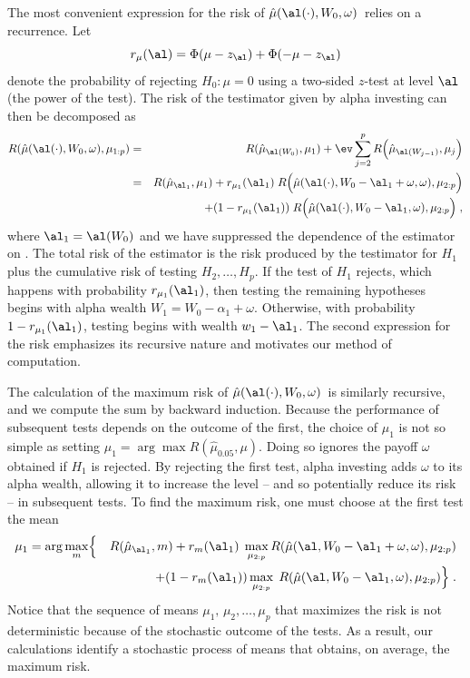 \documentclass{gSCS2e}
\newcommand{\test}{\mbox{$\hat\mu(\al(\cdot),W_0,\omega)$}}
\begin{document}
 The most convenient expression for the risk of \test\ relies on a recurrence.
 Let
 \begin{displaymath}
   r_\mu(\al) = \Phi(\mu-z_\al)+\Phi(-\mu-z_\al)   
 \end{displaymath}
 denote the probability of rejecting $H_0: \mu=0$ using a two-sided $z$-test at
 level $\al$ (the power of the test).  The risk of the testimator given by alpha
 investing can then be decomposed as
 \begin{eqnarray}
   R(\hat\mu(\al(\cdot),W_0,\omega),\mu_{1:p}) 
    &=& R(\hat\mu_{\al(W_0)},\mu_1)
        + \ev \sum_{j=2}^p R\Bigl(\hat\mu_{\al(W_{j-1})},\mu_j\Bigr)  \cr
    &=& R(\hat\mu_{\al_1},\mu_1)
        + r_{\mu_1}(\al_1)\; 
          R\Bigl(\hat\mu(\al(\cdot),W_0-\al_1+\omega,\omega),\mu_{2:p}\Bigr)\cr
    & & \qquad + (1-r_{\mu_1}(\al_1))\; 
          R\Bigl(\hat\mu(\al(\cdot),W_0-\al_1,\omega),\mu_{2:p}\Bigr) \;,
 \label{eq:RMuHat}
 \end{eqnarray}
 where $\al_1 = \al(W_0)$ and we have suppressed the dependence of the estimator
 on \YY.   The total risk of the estimator is the
 risk produced by the testimator for $H_1$ plus the cumulative risk of testing
 $H_2, \ldots, H_p$.  If the test of $H_1$ rejects, which happens with
 probability $r_{\mu_1}(\al_1)$, then testing the remaining hypotheses begins
 with alpha wealth $W_1 = W_0 - \alpha_1 + \omega$.  Otherwise, with probability
 $1- r_{\mu_1}(\al_1)$, testing begins with wealth $w_1 - \al_1$. The second expression
  for the risk  emphasizes its recursive nature and
 motivates our method of computation. 


 The calculation of the maximum risk of \test\ is similarly recursive,
 and we compute the sum by backward induction.  Because the performance of
 subsequent tests depends on the outcome of the first, the choice of $\mu_1$ is
 not so simple as setting $\mu_1 = \arg \max R(\hat\mu_{0.05}, \mu)$.  Doing so
 ignores the payoff $\omega$ obtained if $H_1$ is rejected.  By rejecting the
 first test, alpha investing adds
 $\omega$ to its alpha wealth, allowing it to increase the level -- and so
 potentially reduce its risk -- in subsequent tests.  To find the maximum risk, one 
 must choose at the first test the mean
 \begin{eqnarray*}
    \mu_1 = \arg \max_{m} & \Bigl\{ & R(\hat\mu_{\al_1},m) \Bigr. 
        + r_{m}(\al_1) \; \max_{\mu_{2:p}} 
              R(\hat\mu(\al,W_0-\al_1+\omega,\omega),\mu_{2:p})\cr
    & & + \Bigl. (1-r_{m}(\al_1)) \max_{\mu_{2:p}} \; 
              R(\hat\mu(\al,W_0-\al_1,\omega),\mu_{2:p}) \Bigr\} \;.
 \end{eqnarray*}
 Notice that the sequence of means $\mu_1,\, \mu_2,\ldots, \mu_p$ that maximizes the risk is
 not deterministic because of the stochastic outcome of the tests.  As a result,
 our calculations identify a stochastic process of means that obtains, on
 average, the maximum risk.
\end{document}
